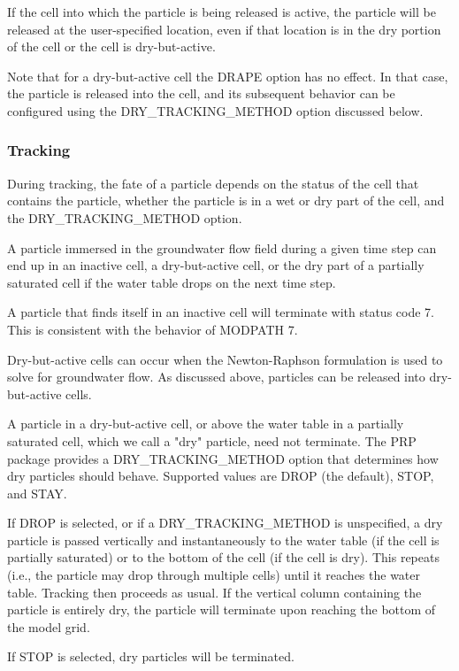 If the cell into which the particle is being released is active, the particle will be released at the user-specified location, even if that location is in the dry portion of the cell or the cell is dry-but-active.

Note that for a dry-but-active cell the DRAPE option has no effect. In that case, the particle is released into the cell, and its subsequent behavior can be configured using the DRY\_TRACKING\_METHOD option discussed below.

\subsubsection{Tracking}

During tracking, the fate of a particle depends on the status of the cell that contains the particle, whether the particle is in a wet or dry part of the cell, and the DRY\_TRACKING\_METHOD option.

A particle immersed in the groundwater flow field during a given time step can end up in an inactive cell, a dry-but-active cell, or the dry part of a partially saturated cell if the water table drops on the next time step.

A particle that finds itself in an inactive cell will terminate with status code 7. This is consistent with the behavior of MODPATH 7.

Dry-but-active cells can occur when the Newton-Raphson formulation is used to solve for groundwater flow. As discussed above, particles can be released into dry-but-active cells.

A particle in a dry-but-active cell, or above the water table in a partially saturated cell, which we call a "dry" particle, need not terminate. The PRP package provides a DRY_TRACKING_METHOD option that determines how dry particles should behave. Supported values are DROP (the default), STOP, and STAY.

If DROP is selected, or if a DRY_TRACKING_METHOD is unspecified, a dry particle is passed vertically and instantaneously to the water table (if the cell is partially saturated) or to the bottom of the cell (if the cell is dry). This repeats (i.e., the particle may drop through multiple cells) until it reaches the water table. Tracking then proceeds as usual. If the vertical column containing the particle is entirely dry, the particle will terminate upon reaching the bottom
of the model grid.

If STOP is selected, dry particles will be terminated.

